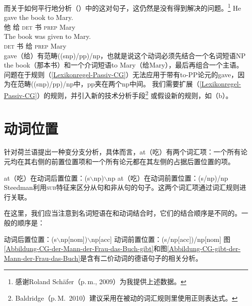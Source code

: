 \noindent
而关于如何平行地分析（）中的这对句子，这仍然是没有得到解决的问题。\footnote{%
  感谢Roland Sch\"{a}fer（p.\,m., 2009）为我提供上述数据。
}
\eal
\ex 
\gll He gave the book to Mary.\\
他 给 \textsc{det} 书 \textsc{prep} Mary\\
\ex 
\gll The book was given to Mary.\\
\textsc{det} 书  \passivepst{} 给 \textsc{prep} Mary\\
\zl
gave（给）有范畴((s\bs np)/pp)/np，也就是说这个动词必须先结合一个名词短语NP the book（那本书）和一个介词短语to Mary（给Mary），最后再组合一个主语。
问题在于规则（\ref{Lexikonregel-Passiv-CG}）无法应用于带有to-PP论元的gave，因为在范畴((s\bs np)/pp)/np中，pp夹在两个np中间。
我们需要扩展（\ref{Lexikonregel-Passiv-CG}）的规则，并引入新的技术分析手段\footnote{%
  Baldridge（p.\,M.\ 2010）建议采用在被动的词汇规则里使用正则表达式。
 }
或假设新的规则，如（b）。

\section{动词位置}
\label{sec-Verbstellung-CG-Steedman}

\mbox{} \citet[]{Steedman2000a-u}
针对荷兰语提出一种变分支分析，具体而言，at（吃）有两个词汇项：一个所有论元均在其右侧的前置位置项和一个所有论元都在其左侧的占据后置位置的项。

\eal
\ex at（吃）在动词后置位置：(s$\backslash$np)$\backslash$np
\ex at（吃）在动词前置位置：(s/np)/np
\zl
Steedman利用\textsc{sub}特征来区分从句和非从句的句子。这两个词汇项通过词汇规则进行关联。

在这里，我们应当注意到名词短语在和动词结合时，它们的结合顺序是不同的。一般的顺序是：

\eal
\label{CG-Verbbewegung}
\ex 动词后置位置：(s$\backslash$np[nom])$\backslash$np[acc]
\ex 动词前置位置：(s/np[acc])/np[nom]
\zl
图\ref{Abbildung-CG-der-Mann-der-Frau-das-Buch-gibt}和图\ref{Abbildung-CG-gibt-der-Mann-der-Frau-das-Buch}是含有二价动词的德语句子的相关分析。

